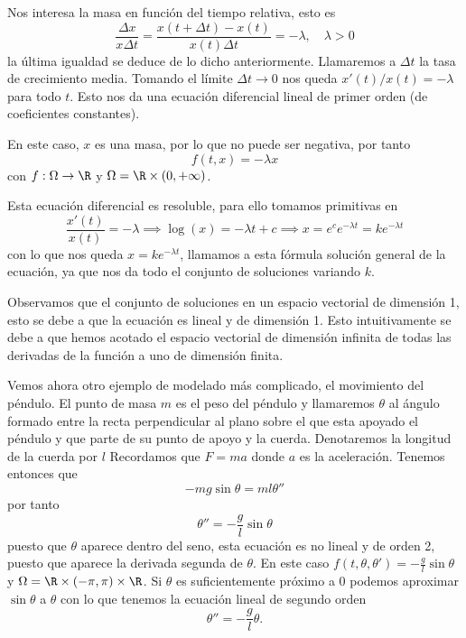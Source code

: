 \documentclass[../main.tex]{subfiles}
\begin{document}
Nos interesa la masa en función del tiempo relativa, esto es
\[\frac{\Delta x}{x \Delta t} = \frac{x(t + \Delta t) - x(t)}{x(t) \Delta t}
	= -\lambda, \quad \lambda > 0\]
la última igualdad se deduce de lo dicho anteriormente. Llamaremos a 
\(\Delta t\) la tasa de crecimiento media. Tomando el límite \(\Delta t \to 0\)
nos queda \(x'(t)/x(t) = -\lambda\) para todo \(t\). Esto nos da una ecuación
diferencial lineal de primer orden (de coeficientes constantes).

En este caso, \(x\) es una masa, por lo que no puede ser negativa, por tanto
\[f(t, x) = -\lambda x\] con \(f : \Omega \to \R\) y \(\Omega = \R \times
(0, +\infty)\).

Esta ecuación diferencial es resoluble, para ello tomamos primitivas en
\[\frac{x'(t)}{x(t)} = -\lambda \implies \log(x) = -\lambda t + c
	\implies x = e^c e^{-\lambda t} = k e^{-\lambda t}\]
con lo que nos queda \(x = k e^{-\lambda t}\), llamamos a esta fórmula solución
general de la ecuación, ya que nos da todo el conjunto de soluciones variando
\(k\).

Observamos que el conjunto de soluciones en un espacio vectorial de dimensión 1,
esto se debe a que la ecuación es lineal y de dimensión 1. Esto intuitivamente
se debe a que hemos acotado el espacio vectorial de dimensión infinita de todas
las derivadas de la función a uno de dimensión finita.

Vemos ahora otro ejemplo de modelado más complicado, el movimiento del péndulo.
El punto de masa \(m\) es el peso del péndulo y llamaremos \(\theta\) al ángulo
formado entre la recta perpendicular al plano sobre el que esta apoyado el
péndulo y que parte de su punto de apoyo y la cuerda. Denotaremos la longitud
de la cuerda por \(l\) Recordamos que \(F = ma\) donde \(a\) es la aceleración. 
Tenemos entonces que
\[-m g \sin\theta = m l \theta''\]
por tanto
\[\theta'' = -\frac{g}{l} \sin\theta\]
puesto que \(\theta\) aparece dentro del seno, esta ecuación es no lineal y de
orden 2, puesto que aparece la derivada segunda de \(\theta\). En este caso 
\(f(t, \theta, \theta') = -\frac{g}{l} \sin\theta\) y \(\Omega = \R \times
(-\pi, \pi) \times \R\). Si \(\theta\) es suficientemente próximo a \(0\)
podemos aproximar \(\sin\theta\) a \(\theta\) con lo que tenemos la ecuación
lineal de segundo orden
\[\theta'' = -\frac{g}{l}\theta.\]
\end{document}
